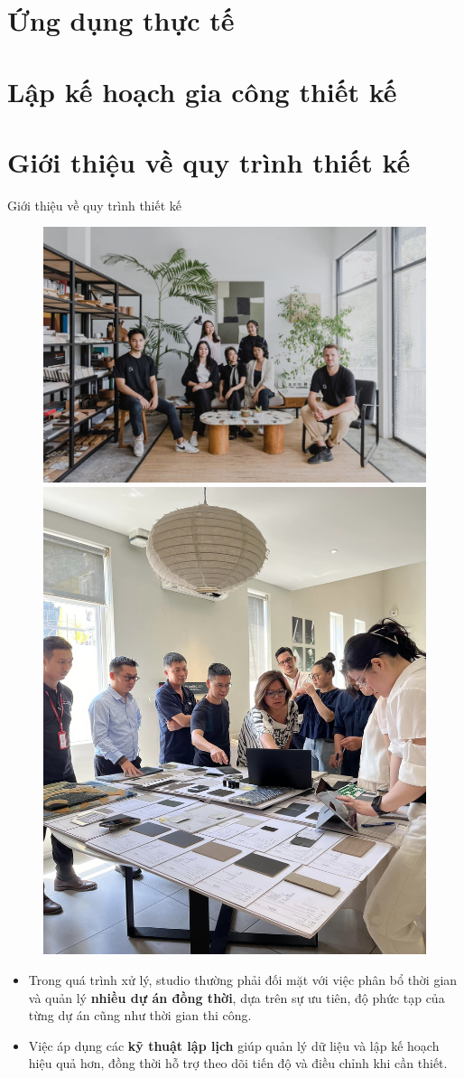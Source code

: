 \documentclass[10pt]{beamer}
\begin{document}
\section{Ứng dụng thực tế}

\section*{Lập kế hoạch gia công thiết kế}

\section*{Giới thiệu về quy trình thiết kế}

\begin{frame}{Giới thiệu về quy trình thiết kế}
\begin{figure}[h]
\centering
\includegraphics[width=0.5\linewidth]{nt1.jpg}
\includegraphics[width=0.274\linewidth]{nt2.jpg}
\end{figure}

\begin{itemize}
\item<1-> Trong quá trình xử lý, studio thường phải đối mặt với việc phân bổ thời gian và quản lý \textbf{nhiều dự án đồng thời}, dựa trên sự ưu tiên, độ phức tạp của từng dự án cũng như thời gian thi công.

\item<2-> Việc áp dụng các \textbf{kỹ thuật lập lịch} giúp quản lý dữ liệu và lập kế hoạch hiệu quả hơn, đồng thời hỗ trợ theo dõi tiến độ và điều chỉnh khi cần thiết.
\end{itemize}
\end{frame}
\end{document}
